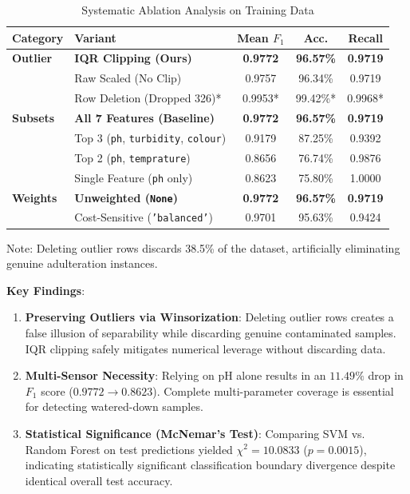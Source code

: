 \documentclass[conference]{IEEEtran}
\begin{document}
\begin{table}[htbp]
\caption{Systematic Ablation Analysis on Training Data}
\label{tab:ablations}
\centering
\begin{tabular}{llccc}
\toprule
\textbf{Category} & \textbf{Variant} & \textbf{Mean $F_1$} & \textbf{Acc.} & \textbf{Recall} \\
\midrule
\textbf{Outlier} & \textbf{IQR Clipping (Ours)} & \textbf{0.9772} & \textbf{96.57\%} & \textbf{0.9719} \\
& Raw Scaled (No Clip) & 0.9757 & 96.34\% & 0.9719 \\
& Row Deletion (Dropped 326)* & 0.9953* & 99.42\%* & 0.9968* \\
\midrule
\textbf{Subsets} & \textbf{All 7 Features (Baseline)} & \textbf{0.9772} & \textbf{96.57\%} & \textbf{0.9719} \\
& Top 3 (\texttt{ph}, \texttt{turbidity}, \texttt{colour}) & 0.9179 & 87.25\% & 0.9392 \\
& Top 2 (\texttt{ph}, \texttt{temprature}) & 0.8656 & 76.74\% & 0.9876 \\
& Single Feature (\texttt{ph} only) & 0.8623 & 75.80\% & 1.0000 \\
\midrule
\textbf{Weights} & \textbf{Unweighted (\texttt{None})} & \textbf{0.9772} & \textbf{96.57\%} & \textbf{0.9719} \\
& Cost-Sensitive (\texttt{'balanced'}) & 0.9701 & 95.63\% & 0.9424 \\
\bottomrule
\end{tabular}
\vspace{1ex}
{\raggedright \footnotesize *Note: Deleting outlier rows discards 38.5\% of the dataset, artificially eliminating genuine adulteration instances.\par}
\end{table}

\textbf{Key Findings}:
\begin{enumerate}
    \item \textbf{Preserving Outliers via Winsorization}: Deleting outlier rows creates a false illusion of separability while discarding genuine contaminated samples. IQR clipping safely mitigates numerical leverage without discarding data.
    \item \textbf{Multi-Sensor Necessity}: Relying on pH alone results in an $11.49\%$ drop in $F_1$ score ($0.9772 \rightarrow 0.8623$). Complete multi-parameter coverage is essential for detecting watered-down samples.
    \item \textbf{Statistical Significance (McNemar's Test)}: Comparing SVM vs. Random Forest on test predictions yielded $\chi^2 = 10.0833$ ($p = 0.0015$), indicating statistically significant classification boundary divergence despite identical overall test accuracy.
\end{enumerate}
\end{document}
